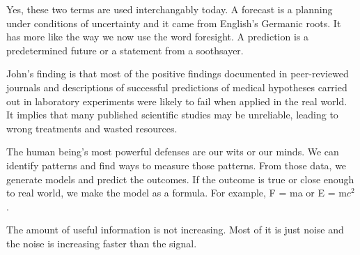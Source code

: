 \documentclass[12pt]{article}
\begin{document}

\begin{enumerate}


Yes, these two terms are used interchangably today. A forecast is a planning under conditions of uncertainty and it came from English's Germanic roots. It has more like the way we now use the word foresight. A prediction is a predetermined future or a statement from a soothsayer.


John's finding is that most of the positive findings documented in peer-reviewed journals and descriptions of successful predictions of medical hypotheses carried out in laboratory experiments were likely to fail when applied in the real world. It implies that many published scientific studies may be unreliable, leading to wrong treatments and wasted resources.


The human being's most powerful defenses are our wits or our minds. We can identify patterns and find ways to measure those patterns. From those data, we generate models and predict the outcomes. If the outcome is true or close enough to real world, we make the model as a formula. For example, F = ma or E = m$c^2$.


The amount of useful information is not increasing. Most of it is just noise and the noise is increasing faster than the signal.



\end{enumerate}
\end{document}
